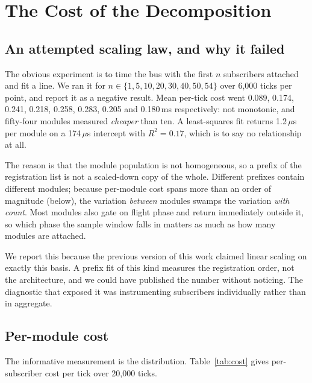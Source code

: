 \documentclass[conference]{IEEEtran}
\begin{document}
\section{The Cost of the Decomposition}
\label{sec:cost}

\subsection{An attempted scaling law, and why it failed}

The obvious experiment is to time the bus with the first $n$ subscribers
attached and fit a line. We ran it for $n \in \{1,5,10,20,30,40,50,54\}$ over
6{,}000 ticks per point, and report it as a negative result. Mean per-tick
cost went 0.089, 0.174, 0.241, 0.218, 0.258, 0.283, 0.205 and 0.180\,ms
respectively: not monotonic, and fifty-four modules measured \emph{cheaper}
than ten. A least-squares fit returns 1.2\,$\mu$s per module on a 174\,$\mu$s
intercept with $R^2 = 0.17$, which is to say no relationship at all.

The reason is that the module population is not homogeneous, so a prefix of
the registration list is not a scaled-down copy of the whole. Different
prefixes contain different modules; because per-module cost spans more than an
order of magnitude (below), the variation \emph{between} modules swamps the
variation \emph{with count}. Most modules also gate on flight phase and return
immediately outside it, so which phase the sample window falls in matters as
much as how many modules are attached.

We report this because the previous version of this work claimed linear
scaling on exactly this basis. A prefix fit of this kind measures the
registration order, not the architecture, and we could have published the
number without noticing. The diagnostic that exposed it was instrumenting
subscribers individually rather than in aggregate.

\subsection{Per-module cost}

The informative measurement is the distribution. Table~\ref{tab:cost} gives
per-subscriber cost per tick over 20{,}000 ticks.
\end{document}
